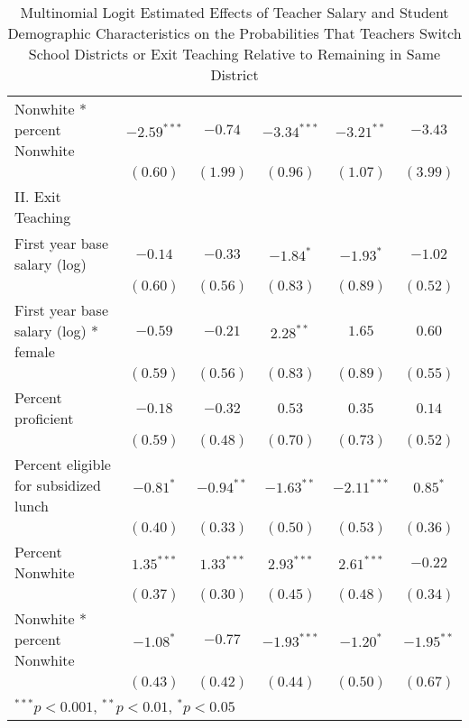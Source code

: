 \documentclass[]{article}
\begin{document}
\begin{table}
\begin{center}
\begin{tabular}{l c c c c c }
\quad Nonwhite * percent Nonwhite            & $-2.59^{***}$ & $-0.74$      & $-3.34^{***}$ & $-3.21^{**}$  & $-3.43$      \\
                                                & $(0.60)$      & $(1.99)$     & $(0.96)$      & $(1.07)$      & $(3.99)$     \\
II. Exit Teaching                               &               &              &               &               &              \\
\quad First year base salary (log)           & $-0.14$       & $-0.33$      & $-1.84^{*}$   & $-1.93^{*}$   & $-1.02$      \\
                                                & $(0.60)$      & $(0.56)$     & $(0.83)$      & $(0.89)$      & $(0.52)$     \\
\quad First year base salary (log) * female  & $-0.59$       & $-0.21$      & $2.28^{**}$   & $1.65$        & $0.60$       \\
                                                & $(0.59)$      & $(0.56)$     & $(0.83)$      & $(0.89)$      & $(0.55)$     \\
\quad Percent proficient                     & $-0.18$       & $-0.32$      & $0.53$        & $0.35$        & $0.14$       \\
                                                & $(0.59)$      & $(0.48)$     & $(0.70)$      & $(0.73)$      & $(0.52)$     \\
\quad Percent eligible for subsidized lunch  & $-0.81^{*}$   & $-0.94^{**}$ & $-1.63^{**}$  & $-2.11^{***}$ & $0.85^{*}$   \\
                                                & $(0.40)$      & $(0.33)$     & $(0.50)$      & $(0.53)$      & $(0.36)$     \\
\quad Percent Nonwhite                       & $1.35^{***}$  & $1.33^{***}$ & $2.93^{***}$  & $2.61^{***}$  & $-0.22$      \\
                                                & $(0.37)$      & $(0.30)$     & $(0.45)$      & $(0.48)$      & $(0.34)$     \\
\quad Nonwhite * percent Nonwhite            & $-1.08^{*}$   & $-0.77$      & $-1.93^{***}$ & $-1.20^{*}$   & $-1.95^{**}$ \\
                                                & $(0.43)$      & $(0.42)$     & $(0.44)$      & $(0.50)$      & $(0.67)$     \\
\hline
\multicolumn{6}{l}{\scriptsize{$^{***}p<0.001$, $^{**}p<0.01$, $^*p<0.05$}}
\end{tabular}
\caption{Multinomial Logit Estimated Effects of Teacher Salary and Student Demographic Characteristics on the Probabilities That Teachers Switch School Districts or Exit Teaching Relative to Remaining in Same District}
\label{tbl:reg_mlogit}
\end{center}
\end{table}
\end{document}
